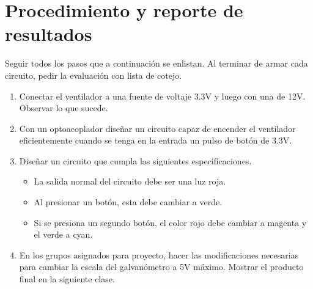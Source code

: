 \documentclass[letterpaper, 12 pt, conference]{ieeeconf}  %
\begin{document}
\section{Procedimiento y reporte de resultados}
Seguir todos los pasos que a continuación se enlistan. Al terminar de armar cada circuito, pedir la evaluación con lista de cotejo.

\begin{enumerate}
    \item Conectar el ventilador a una fuente de voltaje 3.3V y luego con una de 12V. Observar lo que sucede.
    \item Con un optoacoplador diseñar un circuito capaz de encender el ventilador eficientemente cuando se tenga en la entrada un pulso de botón de 3.3V.
    \item Diseñar un circuito que cumpla las siguientes especificaciones.
        \begin{itemize}
            \item La salida normal del circuito debe ser una luz roja.
            \item Al presionar un botón, esta debe cambiar a verde.
            \item Si se presiona un segundo botón, el color rojo debe cambiar a magenta y el verde a cyan.
        \end{itemize}
    \item En los grupos asignados para proyecto, hacer las modificaciones necesarias para cambiar la escala del galvanómetro a 5V máximo. Mostrar el producto final en la siguiente clase.
\end{enumerate}


\addtolength{\textheight}{-12cm}   %
\end{document}
